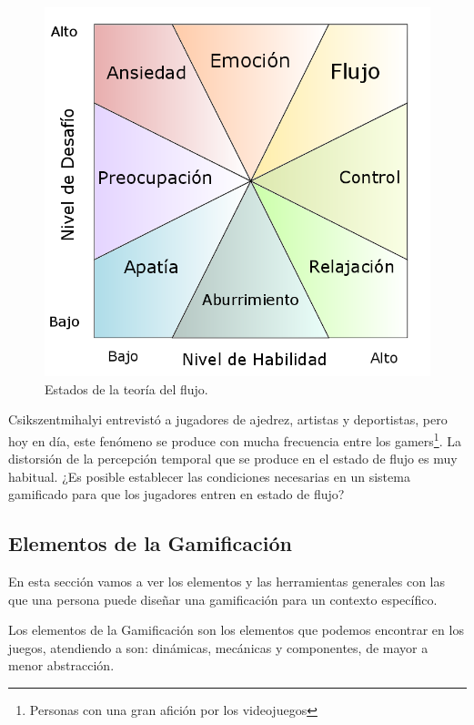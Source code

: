\begin{figure}[hbt]
\begin{center}
\includegraphics[scale=0.40]{img/Flujo.png}
\caption{Estados de la teoría del flujo.}
\label{fig::Flujo}
\end{center}
\vspace{-0.5cm}
\end{figure}

Csikszentmihalyi entrevistó a jugadores de ajedrez, artistas y deportistas, pero hoy en día, este fenómeno se produce con mucha frecuencia entre los gamers\footnote{Personas con una gran afición por los videojuegos}.
%
La distorsión de la percepción temporal que se produce en el estado de flujo es muy habitual.
%
¿Es posible establecer las condiciones necesarias en un sistema gamificado para que los jugadores entren en estado de flujo?


\subsection{Elementos de la Gamificación}

En esta sección vamos a ver los elementos y las herramientas generales con las que una persona puede diseñar una gamificación para un contexto específico.

Los elementos de la Gamificación son los elementos que podemos encontrar en los juegos, atendiendo a  \cite{werbach2012win} son: dinámicas, mecánicas y componentes, de mayor a menor abstracción.

